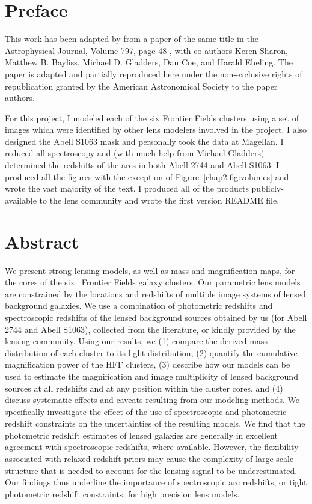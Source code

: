 \section{Preface}

This work has been adapted by from a paper of the same title in the Astrophysical Journal, Volume 797, page 48 \citep{Johnson:2014tg}, with co-authors Keren Sharon, Matthew B. Bayliss, Michael D. Gladders, Dan Coe, and Harald Ebeling. The paper is adapted and partially reproduced here under the non-exclusive rights of republication granted by the American Astronomical Society to the paper authors.

For this project, I modeled each of the six Frontier Fields clusters using a set of images which were identified by other lens modelers involved in the project. I also designed the Abell S1063 mask and personally took the data at Magellan. I reduced all spectroscopy and (with much help from Michael Gladders) determined the redshifts of the arcs in both Abell 2744 and Abell S1063. I produced all the figures with the exception of Figure~\ref{chap2:fig:volumes} and wrote the vast majority of the text. I produced all of the products publicly-available to the lens community and wrote the first version README file.

\section{Abstract}

We present strong-lensing models, as well as mass and magnification maps, for the cores of the six \hst\ Frontier Fields galaxy clusters. Our parametric lens models are constrained by the locations and redshifts of multiple image systems of lensed background galaxies. We use a combination of photometric redshifts and spectroscopic redshifts of the lensed background sources obtained by us (for Abell 2744 and Abell S1063), collected from the literature, or kindly provided by the lensing community. Using our results, we (1) compare the derived mass distribution of each cluster to its light distribution, (2) quantify the cumulative magnification power of the HFF clusters, (3) describe how our models can be used to estimate the magnification and image multiplicity of lensed background sources at all redshifts and at any position within the cluster cores, and (4) discuss systematic effects and caveats resulting from our modeling methods. We specifically investigate the effect of the use of spectroscopic and photometric redshift constraints on the uncertainties of the resulting models. We find that the photometric redshift estimates of lensed galaxies are generally in excellent agreement with spectroscopic redshifts, where available. However, the flexibility associated with relaxed redshift priors may cause the complexity of large-scale structure that is needed to account for the lensing signal to be underestimated. Our findings thus underline the importance of spectroscopic arc redshifts, or tight photometric redshift constraints, for high precision lens models.

